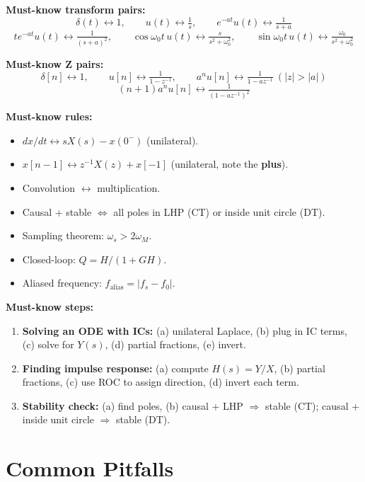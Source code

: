 \documentclass{article}
\begin{document}
\textbf{Must-know transform pairs:}
$$\delta(t)\leftrightarrow 1,\qquad u(t)\leftrightarrow \tfrac{1}{s},\qquad e^{-at}u(t)\leftrightarrow \tfrac{1}{s+a}$$
$$te^{-at}u(t)\leftrightarrow \tfrac{1}{(s+a)^2},\qquad \cos\omega_0 t\,u(t)\leftrightarrow \tfrac{s}{s^2+\omega_0^2},\qquad \sin\omega_0 t\,u(t)\leftrightarrow \tfrac{\omega_0}{s^2+\omega_0^2}$$

\textbf{Must-know Z pairs:}
$$\delta[n]\leftrightarrow 1,\qquad u[n]\leftrightarrow \tfrac{1}{1-z^{-1}},\qquad a^n u[n]\leftrightarrow \tfrac{1}{1-az^{-1}}\ (|z|>|a|)$$
$$(n+1)a^n u[n]\leftrightarrow \tfrac{1}{(1-az^{-1})^2}$$

\textbf{Must-know rules:}
\begin{itemize}
  \item $dx/dt \leftrightarrow sX(s)-x(0^-)$ (unilateral).
  \item $x[n-1] \leftrightarrow z^{-1}X(z)+x[-1]$ (unilateral, note the \textbf{plus}).
  \item Convolution $\leftrightarrow$ multiplication.
  \item Causal + stable $\Leftrightarrow$ all poles in LHP (CT) or inside unit circle (DT).
  \item Sampling theorem: $\omega_s > 2\omega_M$.
  \item Closed-loop: $Q = H/(1+GH)$.
  \item Aliased frequency: $f_\text{alias} = |f_s - f_0|$.
\end{itemize}

\textbf{Must-know steps:}
\begin{enumerate}
  \item \textbf{Solving an ODE with ICs:} (a) unilateral Laplace, (b) plug in IC terms, (c) solve for $Y(s)$, (d) partial fractions, (e) invert.
  \item \textbf{Finding impulse response:} (a) compute $H(s)=Y/X$, (b) partial fractions, (c) use ROC to assign direction, (d) invert each term.
  \item \textbf{Stability check:} (a) find poles, (b) causal + LHP $\Rightarrow$ stable (CT); causal + inside unit circle $\Rightarrow$ stable (DT).
\end{enumerate}

\section{Common Pitfalls}
\end{document}
